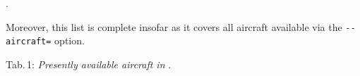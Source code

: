 .

Moreover, this list is complete insofar as it covers all aircraft available via the \texttt{-$ $-aircraft=} option. 
\eject

\noindent
 Tab.\,1: \textit{Presently available aircraft in \FlightGear{}}.
 \medskip
 
\noindent
{\scriptsize

}

